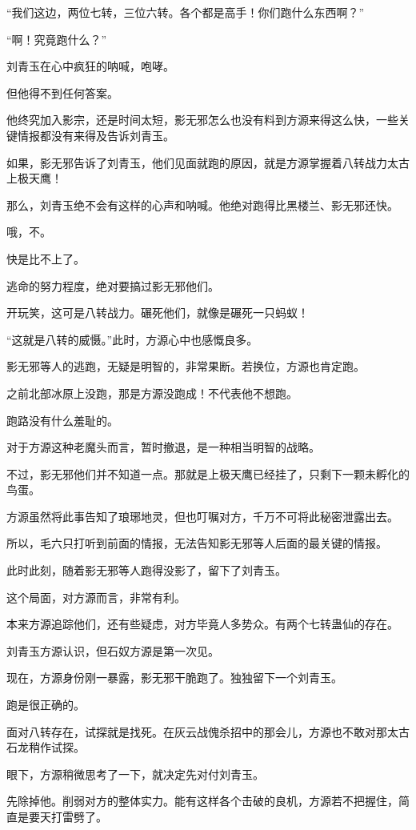 \begin{this_body}
“我们这边，两位七转，三位六转。各个都是高手！你们跑什么东西啊？”

“啊！究竟跑什么？”

刘青玉在心中疯狂的呐喊，咆哮。

但他得不到任何答案。

他终究加入影宗，还是时间太短，影无邪怎么也没有料到方源来得这么快，一些关键情报都没有来得及告诉刘青玉。

如果，影无邪告诉了刘青玉，他们见面就跑的原因，就是方源掌握着八转战力太古上极天鹰！

那么，刘青玉绝不会有这样的心声和呐喊。他绝对跑得比黑楼兰、影无邪还快。

哦，不。

快是比不上了。

逃命的努力程度，绝对要搞过影无邪他们。

开玩笑，这可是八转战力。碾死他们，就像是碾死一只蚂蚁！

“这就是八转的威慑。”此时，方源心中也感慨良多。

影无邪等人的逃跑，无疑是明智的，非常果断。若换位，方源也肯定跑。

之前北部冰原上没跑，那是方源没跑成！不代表他不想跑。

跑路没有什么羞耻的。

对于方源这种老魔头而言，暂时撤退，是一种相当明智的战略。

不过，影无邪他们并不知道一点。那就是上极天鹰已经挂了，只剩下一颗未孵化的鸟蛋。

方源虽然将此事告知了琅琊地灵，但也叮嘱对方，千万不可将此秘密泄露出去。

所以，毛六只打听到前面的情报，无法告知影无邪等人后面的最关键的情报。

此时此刻，随着影无邪等人跑得没影了，留下了刘青玉。

这个局面，对方源而言，非常有利。

本来方源追踪他们，还有些疑虑，对方毕竟人多势众。有两个七转蛊仙的存在。

刘青玉方源认识，但石奴方源是第一次见。

现在，方源身份刚一暴露，影无邪干脆跑了。独独留下一个刘青玉。

跑是很正确的。

面对八转存在，试探就是找死。在灰云战傀杀招中的那会儿，方源也不敢对那太古石龙稍作试探。

眼下，方源稍微思考了一下，就决定先对付刘青玉。

先除掉他。削弱对方的整体实力。能有这样各个击破的良机，方源若不把握住，简直是要天打雷劈了。


\end{this_body}
